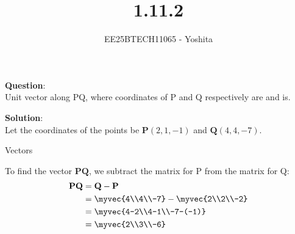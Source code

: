 \documentclass[journal]{IEEEtran}
\begin{document}

\vspace{3cm}

\title{1.11.2}
\author{EE25BTECH11065 - Yoshita}
{\let\newpage\relax\maketitle}

\renewcommand{\thefigure}{\theenumi}
\renewcommand{\thetable}{\theenumi}
\setlength{\intextsep}{10pt} %
\textbf{Question}:\\
    Unit vector along PQ, where coordinates of P and Q respectively are  and  is.\\
\bigskip

\textbf{Solution}:\\
Let the coordinates of the points be $\mathbf{P}(2, 1, -1)$ and $\mathbf{Q}(4, 4, -7)$.
\begin{table}[H]    
  \centering
  
  \caption{Vectors}
  \label{Answers}
\end{table}
To find the vector \(\mathbf{PQ}\), we subtract the matrix for P from the matrix for Q:
\begin{align}
    \mathbf{PQ} &= \mathbf{Q} - \mathbf{P} \\
    &= 
   \myvec{4\\4\\-7}
    -
    \myvec{2\\2\\-2} \\
    &= 
    \myvec{4-2\\4-1\\-7-(-1)} \\
    &= 
    \myvec{2\\3\\-6}
\end{align}
\end{document}
